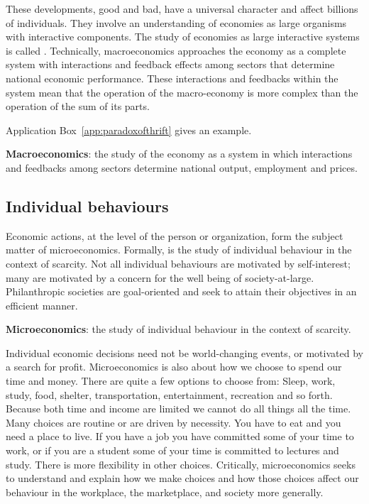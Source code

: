 \newhtmlpage

These developments, good and bad, have a universal character and affect
billions of individuals. They involve an understanding of economies as large
organisms with interactive components. The study of economies as large
interactive systems is called . Technically,
macroeconomics approaches the economy as a complete system with interactions
and feedback effects among sectors that determine national economic
performance. These interactions and feedbacks within the system mean that
the operation of the macro-economy is more complex than the operation of the
sum of its parts. 

Application Box~\ref{app:paradoxofthrift} gives an example.

\begin{DefBox}
	\textbf{Macroeconomics}: the study of the economy as a system in which interactions and feedbacks among sectors determine national output, employment and prices.
\end{DefBox}

\newhtmlpage

\subsection*{Individual behaviours}

Economic actions, at the level of the person or organization, form the
subject matter of microeconomics. Formally,  is
the study of individual behaviour in the context of scarcity. Not all
individual behaviours are motivated by self-interest; many are motivated by
a concern for the well being of society-at-large. Philanthropic societies
are goal-oriented and seek to attain their objectives in an efficient
manner. 

\begin{DefBox}
	\textbf{Microeconomics}: the study of individual behaviour in the context of scarcity.
\end{DefBox}

Individual economic decisions need not be world-changing events, or
motivated by a search for profit. Microeconomics is also about how we choose
to spend our time and money. There are quite a few options to choose from:
Sleep, work, study, food, shelter, transportation, entertainment, recreation
and so forth. Because both time and income are limited we cannot do all
things all the time. Many choices are routine or are driven by necessity.
You have to eat and you need a place to live. If you have a job you have
committed some of your time to work, or if you are a student some of your
time is committed to lectures and study. There is more flexibility in other
choices. Critically, microeconomics seeks to understand and explain how we
make choices and how those choices affect our behaviour in the workplace,
the marketplace, and society more generally.

